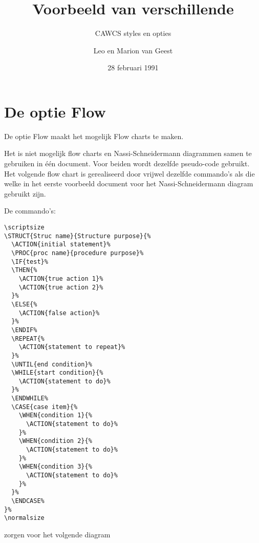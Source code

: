 \author{Leo en Marion van Geest}
\date{28 februari 1991}
\title{Voorbeeld van verschillende}
\subtitle{CAWCS styles en opties}


\section{De optie Flow}

De optie Flow maakt het mogelijk Flow charts te maken.

Het is niet mogelijk flow charts en Nassi-Schneidermann diagrammen samen te
gebruiken in \'e\'en document. Voor beiden wordt dezelfde pseudo-code gebruikt.
Het volgende flow chart is gerealiseerd door vrijwel dezelfde commando's
als die welke in het eerste voorbeeld document voor het Nassi-Schneidermann
diagram gebruikt zijn.

De commando's:

\begin{verbatim}
\scriptsize
\STRUCT{Struc name}{Structure purpose}{%
  \ACTION{initial statement}%
  \PROC{proc name}{procedure purpose}%
  \IF{test}%
  \THEN{%
    \ACTION{true action 1}%
    \ACTION{true action 2}%
  }%
  \ELSE{%
    \ACTION{false action}%
  }%
  \ENDIF%
  \REPEAT{%
    \ACTION{statement to repeat}%
  }%
  \UNTIL{end condition}%
  \WHILE{start condition}{%
    \ACTION{statement to do}%
  }%
  \ENDWHILE%
  \CASE{case item}{%
    \WHEN{condition 1}{%
      \ACTION{statement to do}%
    }%
    \WHEN{condition 2}{%
      \ACTION{statement to do}%
    }%
    \WHEN{condition 3}{%
      \ACTION{statement to do}%
    }%
  }%
  \ENDCASE%
}%
\normalsize
\end{verbatim}


zorgen voor het volgende diagram

\scriptsize
{}%
\normalsize


